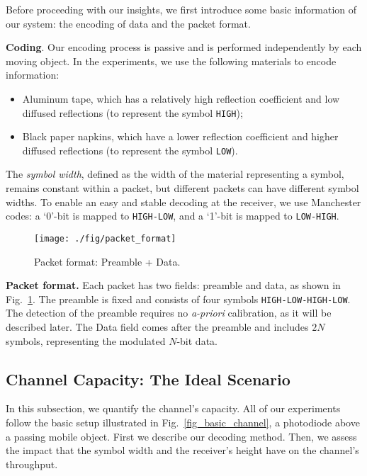 \documentclass[10pt]{sig-alternate-05-2015}
\begin{document}
Before proceeding with our insights, we first introduce some basic information of our system: the encoding of data and the packet format.

{\bf Coding}. Our encoding process is passive and is performed independently by each moving object. 
In the experiments, we use the following materials to encode information:
\begin{itemize}
	\item Aluminum tape, which has a relatively high reflection coefficient and low diffused reflections (to represent the symbol \texttt{HIGH});
	\item Black paper napkins, which have a lower reflection coefficient and higher diffused reflections (to represent the symbol \texttt{LOW}).
\end{itemize}
The {\it symbol width}, defined as the width of the material representing a symbol, remains constant within a packet, but different packets can have different symbol widths.
To enable an easy and stable decoding at the receiver, we use Manchester codes: a `0'-bit is mapped to \texttt{HIGH-LOW}, and a `1'-bit is mapped to \texttt{LOW-HIGH}.

\begin{figure}[t]
	\centering
	\texttt{[image: ./fig/packet\_format]}
	\vspace{-2mm}
	\caption {Packet format: Preamble + Data.}
	\label{fig_pkt_format}
	\vspace{-4mm}
\end{figure}

{\bf Packet format.}   
Each packet has two fields: preamble and data, as shown in Fig.~\ref{fig_pkt_format}. The preamble is fixed and consists of four symbols \texttt{HIGH-LOW-HIGH-LOW}. The detection of the preamble requires no \emph{a-priori} calibration, as it will be described later. The Data field comes after the preamble and includes $2N$ symbols, representing the modulated $N$-bit data.

\subsection{Channel Capacity: The Ideal Scenario} \label{sec_ideal_scenarios}

In this subsection, we quantify the channel's capacity. All of our experiments follow the basic setup illustrated in Fig.~\ref{fig_basic_channel}, a photodiode above a passing mobile object. First we describe our decoding method. Then, we assess the impact that the symbol width and the receiver's height have on the channel's throughput.
\end{document}
